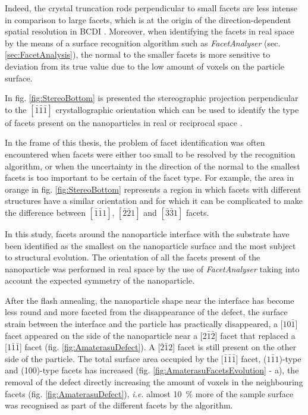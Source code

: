 Indeed, the crystal truncation rods perpendicular to small facets are less intense in comparison to large facets, which is at the origin of the direction-dependent spatial resolution in BCDI \parencite{cherukara_anisotropic_2018}.
Moreover, when identifying the facets in real space by the means of a surface recognition algorithm such as \textit{FacetAnalyser} (sec. \ref{sec:FacetAnalysis}), the normal to the smaller facets is more sensitive to deviation from its true value due to the low amount of voxels on the particle surface.

In fig. \ref{fig:StereoBottom} is presented the stereographic projection perpendicular to the $[\bar{1}\bar{1}\bar{1}]$ crystallographic orientation which can be used to identify the type of facets present on the nanoparticles in real or reciprocal space \parencite{Richard2018}.

In the frame of this thesis, the problem of facet identification was often encountered when facets were either too small to be resolved by the recognition algorithm, or when the uncertainty in the direction of the normal to the smallest facets is too important to be certain of the facet type.
For example, the area in orange in fig. \ref{fig:StereoBottom} represents a region in which facets with different structures have a similar orientation and for which it can be complicated to make the difference between $[\bar{1}\bar{1}1]$, $[\bar{2}\bar{2}1]$ and $[\bar{3}\bar{3}1]$ facets.

In this study, facets around the nanoparticle interface with the substrate have been identified as the smallest on the nanoparticle surface and the most subject to structural evolution.
The orientation of all the facets present of the nanoparticle was performed in real space by the use of \textit{FacetAnalyser} taking into account the expected symmetry of the nanoparticle.

After the flash annealing, the nanoparticle shape near the interface has become less round and more faceted from the disappearance of the defect, the surface strain between the interface and the particle has practically disappeared, a [$10\bar{1}$] facet appeared on the side of the nanoparticle near a [2$\bar{1}\bar{2}$] facet that replaced a [1$\bar{1}\bar{1}$] facet (fig. \ref{fig:AmaterasuDefect}).
A [$\bar{2}\bar{1}2$] facet is still present on the other side of the particle.
The total surface area occupied by the [$\bar{1}\bar{1}\bar{1}$] facet, ($1\bar{1}1$)-type and (100)-type facets has increased (fig. \ref{fig:AmaterasuFacetsEvolution} - a), the removal of the defect directly increasing the amount of voxels in the neighbouring facets (fig. \ref{fig:AmaterasuDefect}), \textit{i.e.} almost \qty{10}{\percent} more of the sample surface was recognised as part of the different facets by the algorithm.

